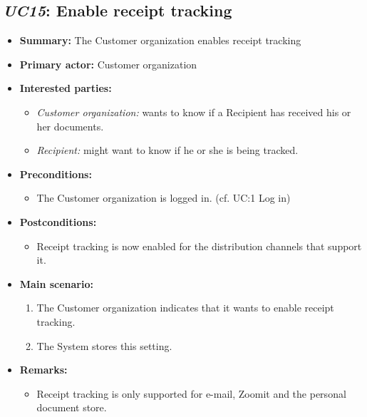 \documentclass[a4paper,10pt]{article}
\begin{document}
\subsection{\emph{UC15}: Enable receipt tracking}
\begin{itemize}
	\item \textbf{Summary:} The Customer organization enables receipt tracking
    \item \textbf{Primary actor:} Customer organization
    \item \textbf{Interested parties:} 
        \begin{itemize}
            \item \textit{Customer organization:} wants to know if a Recipient has received his or her documents.
            \item \textit{Recipient:} might want to know if he or she is being tracked.
        \end{itemize}

    \item \textbf{Preconditions:}
        \begin{itemize}
            \item The Customer organization is logged in. (cf. UC:1 Log in)
        \end{itemize}

    \item \textbf{Postconditions:}
        \begin{itemize}
            \item Receipt tracking is now enabled for the distribution channels that support it.
        \end{itemize}
        
    \item \textbf{Main scenario:} 
    \begin{enumerate}
       \item The Customer organization indicates that it wants to enable receipt tracking.
       \item The System stores this setting.
    \end{enumerate}
    
    \item \textbf{Remarks:}
        \begin{itemize}
            \item Receipt tracking is only supported for e-mail, Zoomit and the personal document store.
        \end{itemize}
\end{itemize}
\end{document}
